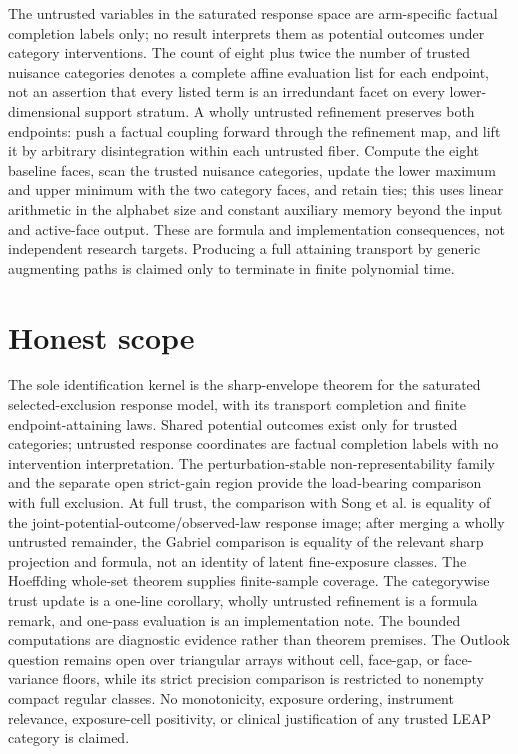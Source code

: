 \documentclass{article}
\begin{document}
The untrusted variables in the saturated response space are arm-specific factual completion labels only; no result interprets them as potential outcomes under category interventions. The count of eight plus twice the number of trusted nuisance categories denotes a complete affine evaluation list for each endpoint, not an assertion that every listed term is an irredundant facet on every lower-dimensional support stratum. A wholly untrusted refinement preserves both endpoints: push a factual coupling forward through the refinement map, and lift it by arbitrary disintegration within each untrusted fiber. Compute the eight baseline faces, scan the trusted nuisance categories, update the lower maximum and upper minimum with the two category faces, and retain ties; this uses linear arithmetic in the alphabet size and constant auxiliary memory beyond the input and active-face output. These are formula and implementation consequences, not independent research targets. Producing a full attaining transport by generic augmenting paths is claimed only to terminate in finite polynomial time.

\section{Honest scope}

The sole identification kernel is the sharp-envelope theorem for the saturated selected-exclusion response model, with its transport completion and finite endpoint-attaining laws. Shared potential outcomes exist only for trusted categories; untrusted response coordinates are factual completion labels with no intervention interpretation. The perturbation-stable non-representability family and the separate open strict-gain region provide the load-bearing comparison with full exclusion. At full trust, the comparison with Song et al. is equality of the joint-potential-outcome/observed-law response image; after merging a wholly untrusted remainder, the Gabriel comparison is equality of the relevant sharp projection and formula, not an identity of latent fine-exposure classes. The Hoeffding whole-set theorem supplies finite-sample coverage. The categorywise trust update is a one-line corollary, wholly untrusted refinement is a formula remark, and one-pass evaluation is an implementation note. The bounded computations are diagnostic evidence rather than theorem premises. The Outlook question remains open over triangular arrays without cell, face-gap, or face-variance floors, while its strict precision comparison is restricted to nonempty compact regular classes. No monotonicity, exposure ordering, instrument relevance, exposure-cell positivity, or clinical justification of any trusted LEAP category is claimed.
\end{document}

